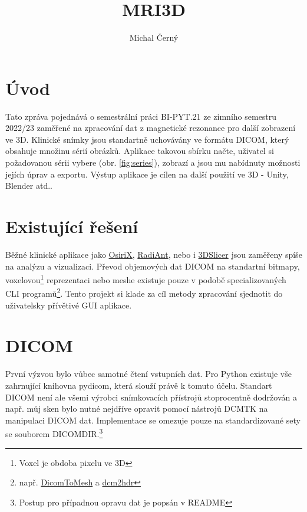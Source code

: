 \documentclass[czech]{pyt-report}
\title{MRI3D}
\author{Michal Černý}
\affiliation{FIT ČVUT}
\begin{document}
\maketitle

\section{Úvod}
\label{sec:uvod}
Tato zpráva pojednává o semestrální práci BI-PYT.21 ze zimního semestru 2022/23 zaměřené na zpracování dat z magnetické rezonance pro další zobrazení ve 3D. Klinické snímky jsou standartně uchovávány ve formátu DICOM, který obsahuje množinu sérií obrázků. Aplikace takovou sbírku načte, uživatel si požadovanou sérii vybere (obr. \ref{fig:series}), zobrazí a jsou mu nabídnuty možnosti jejích úprav a exportu. Výstup aplikace je cílen na další použití ve 3D - Unity, Blender atd..

\section{Existující řešení}
\label{sec:exitujici_reseni}
Běžné klinické aplikace jako \href{https://www.osirix-viewer.com/}{OsiriX}, \href{https://www.radiantviewer.com/}{RadiAnt}, nebo i \href{https://www.slicer.org/}{3DSlicer} jsou zaměřeny spíše na analýzu a vizualizaci. Převod objemových dat DICOM na standartní bitmapy, voxelovou\footnote{Voxel je obdoba pixelu ve 3D} reprezentaci nebo meshe existuje pouze v podobě specializovaných CLI programů\footnote{např. \href{https://github.com/AOT-AG/DicomToMesh}{DicomToMesh} a \href{https://github.com/dvolgyes/dcm2hdr}{dcm2hdr}}. Tento projekt si klade za cíl metody zpracování sjednotit do uživatelsky přívětivé GUI aplikace.

\section{DICOM}
\label{sec:dicom}
První výzvou bylo vůbec samotné čtení vstupních dat. Pro Python existuje vše zahrnující knihovna pydicom\cite{bib:pydicom}, která slouží právě k tomuto účelu. Standart DICOM\cite{bib:dicom-structures}\cite{bib:dicom-dictionary} není ale všemi výrobci snímkovacích přístrojů stoprocentně dodržován a např. můj sken bylo nutné nejdříve opravit pomocí nástrojů DCMTK na manipulaci DICOM dat. Implementace se omezuje pouze na standardizované sety se souborem DICOMDIR.\footnote{Postup pro případnou opravu dat je popsán v README}
\end{document}
